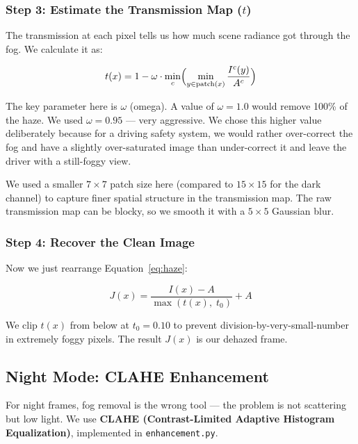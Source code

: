 \documentclass[12pt, a4paper]{article}
\begin{document}
\subsubsection{Step 3: Estimate the Transmission Map ($t$)}

The transmission at each pixel tells us how much scene radiance got through the
fog. We calculate it as:

\begin{equation}
  t(x) = 1 - \omega \cdot \min_{c}
  \Bigl(
    \min_{y \in \text{patch}(x)} \frac{I^c(y)}{A^c}
  \Bigr)
  \label{eq:transmission}
\end{equation}

The key parameter here is $\omega$ (omega). A value of $\omega = 1.0$ would
remove 100\% of the haze. We used $\omega = \mathbf{0.95}$ — very aggressive.
We chose this higher value deliberately because for a driving safety system,
we would rather over-correct the fog and have a slightly over-saturated image
than under-correct it and leave the driver with a still-foggy view.

We used a smaller $7 \times 7$ patch size here (compared to $15 \times 15$ for
the dark channel) to capture finer spatial structure in the transmission map.
The raw transmission map can be blocky, so we smooth it with a $5 \times 5$
Gaussian blur.

\subsubsection{Step 4: Recover the Clean Image}

Now we just rearrange Equation~\ref{eq:haze}:

\begin{equation}
  J(x) = \frac{I(x) - A}{\max(t(x),\; t_0)} + A
  \label{eq:recover}
\end{equation}

We clip $t(x)$ from below at $t_0 = 0.10$ to prevent division-by-very-small-number
in extremely foggy pixels. The result $J(x)$ is our dehazed frame.

\subsection{Night Mode: CLAHE Enhancement}

For night frames, fog removal is the wrong tool — the problem is not scattering
but low light. We use \textbf{CLAHE (Contrast-Limited Adaptive Histogram
Equalization)}, implemented in \texttt{enhancement.py}.
\end{document}
